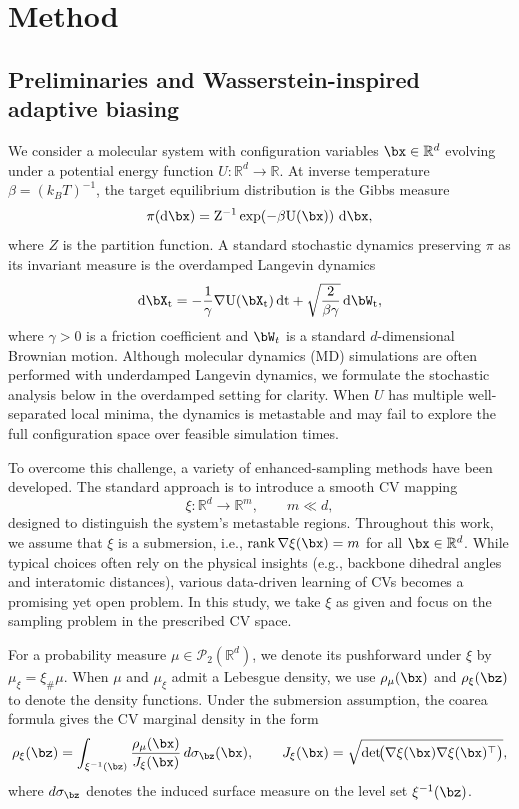 \documentclass[a4paper,fleqn]{cas-sc}
\theoremstyle{definition}
\begin{document}
 \section{Method}\label{sec:method}


\subsection{Preliminaries and Wasserstein-inspired adaptive biasing}
\label{subsec:prelim}

We consider a molecular system with configuration variables $\bx \in \mathbb{R}^{d}$ evolving under a potential energy function $U : \mathbb{R}^{d} \to \mathbb{R}$. 
At inverse temperature \(\beta=(k_B T)^{-1}\), the target equilibrium distribution is the Gibbs measure
\begin{equation}
\pi(\rm d\bx)=Z^{-1}\exp\!\left(-\beta U(\bx)\right)\,\rm d\bx,
\label{eq:boltzmann}    
\end{equation}
where \(Z\) is the partition function. 
A standard stochastic dynamics preserving \(\pi\) as its invariant measure is the overdamped Langevin dynamics
\[
\rm d\bX_t
=
-\frac{1}{\gamma}\nabla U(\bX_t)\, \rm dt
+
\sqrt{\frac{2}{\beta\gamma}}\, \rm d\bW_t ,
\]
where \(\gamma>0\) is a friction coefficient and \(\bW_t\) is a standard \(d\)-dimensional Brownian motion. Although molecular dynamics (MD) simulations are often performed with underdamped Langevin dynamics, we formulate the stochastic analysis below in the overdamped setting for clarity. When \(U\) has multiple well-separated local minima, the dynamics is metastable and may fail to explore the full configuration space over feasible simulation times.



To overcome this challenge, a variety of enhanced-sampling methods have been developed. The standard approach is to introduce a smooth CV mapping
\[
    \xi : \mathbb{R}^{d} \to \mathbb{R}^m, \qquad m \ll d,
\]
designed to distinguish the system's metastable regions. Throughout this work, we assume that $\xi$ is a submersion, i.e., $\operatorname{rank} \nabla\xi(\bx) = m$ for all $\bx \in \mathbb{R}^{d}$.
While typical choices often rely on the physical insights (e.g.,  
backbone dihedral angles and interatomic distances), various data-driven learning of CVs becomes a promising yet open problem. In this study, we take $\xi$ as given and focus on the sampling problem in the prescribed CV space.


For a probability measure \(\mu\in\mathcal P_2(\mathbb R^d)\), we denote its pushforward under \(\xi\) by $\mu_\xi=\xi_\#\mu$. When $\mu$ and $\mu_\xi$ admit a Lebesgue density, we use $\rho_{\mu}(\bx)$ and $\rho_{\xi}(\bz)$ to denote the density functions. 
Under the submersion assumption, the coarea formula gives the CV marginal density in the form
\[
\rho_{\xi}(\bz)
=
\int_{\xi^{-1}(\bz)}
\frac{\rho_\mu(\bx)}{J_\xi(\bx)}\,d\sigma_{\bz}(\bx),
\qquad
J_\xi(\bx)
=
\sqrt{\det\!\bigl(\nabla\xi(\bx)\nabla\xi(\bx)^{\top}\bigr)},
\]
where \(d\sigma_{\bz}\) denotes the induced surface measure on the level set \(\xi^{-1}(\bz)\). 
\end{document}
